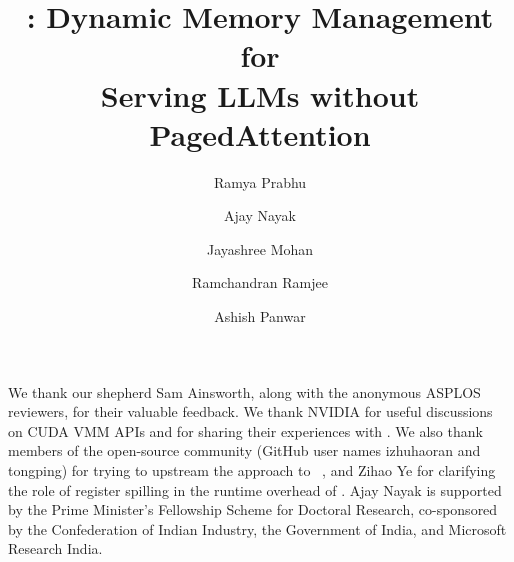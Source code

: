 \documentclass[sigplan,screen]{acmart}
\begin{document}
\title[vAttention: Dynamic Memory Management for Serving LLMs]{\sysname: Dynamic Memory Management for \\ Serving LLMs without PagedAttention}


\author{Ramya Prabhu}

\author{Ajay Nayak}

\author{Jayashree Mohan}

\author{Ramchandran Ramjee}

\author{Ashish Panwar}


\renewcommand{\shortauthors}{Ramya Prabhu, Ajay Nayak, Jayashree Mohan, Ramchandran Ramjee, \& Ashish Panwar}









\maketitle













\begin{acks}
We thank our shepherd Sam Ainsworth, along with the anonymous ASPLOS reviewers, for their valuable feedback. We thank NVIDIA for useful discussions on CUDA VMM APIs and for sharing their experiences with \sysname. We also thank members of the open-source community (GitHub user names izhuhaoran and tongping) for trying to upstream the \sysname approach to \vllm~\cite{vattn-vllm-1,vattn-vllm-2}, and Zihao Ye for clarifying the role of register spilling in the runtime overhead of \pa.  Ajay Nayak is supported by the Prime Minister’s Fellowship Scheme for Doctoral Research, co-sponsored by the Confederation of Indian Industry, the Government of India, and Microsoft Research India.
\end{acks}



\balance



\clearpage

\end{document}
